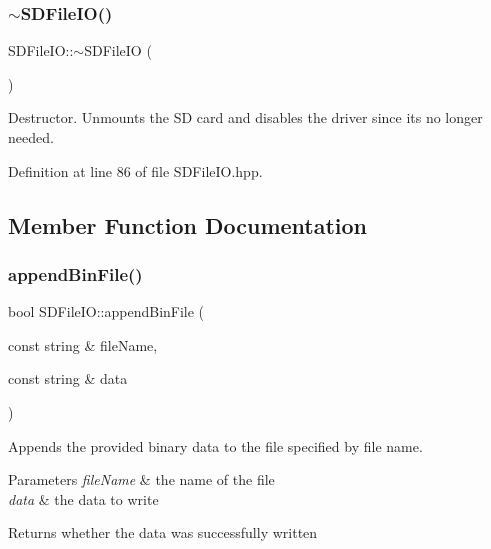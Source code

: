 \subsubsection{\texorpdfstring{$\sim$SDFileIO()}{~SDFileIO()}}
{\footnotesize\ttfamily S\+D\+File\+I\+O\+::$\sim$\+S\+D\+File\+IO (\begin{DoxyParamCaption}{ }\end{DoxyParamCaption})\hspace{0.3cm}{\ttfamily [inline]}}

Destructor. Unmounts the SD card and disables the driver since it\textquotesingle{}s no longer needed. 

Definition at line 86 of file S\+D\+File\+I\+O.\+hpp.


\begin{DoxyCode}{0}

\end{DoxyCode}


\subsection{Member Function Documentation}
\mbox{\label{classSDFileIO_ad03e7421e12132dea157e3e3844233a1}} 
\subsubsection{\texorpdfstring{appendBinFile()}{appendBinFile()}}
{\footnotesize\ttfamily bool S\+D\+File\+I\+O\+::append\+Bin\+File (\begin{DoxyParamCaption}\item[{const string \&}]{file\+Name,  }\item[{const string \&}]{data }\end{DoxyParamCaption})\hspace{0.3cm}{\ttfamily [inline]}}

Appends the provided binary data to the file specified by file name.


\begin{DoxyParams}{Parameters}
{\em file\+Name} & the name of the file \\
\hline
{\em data} & the data to write \\
\hline
\end{DoxyParams}
\begin{DoxyReturn}{Returns}
whether the data was successfully written 
\end{DoxyReturn}


